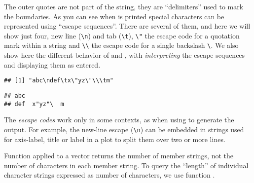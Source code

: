 \documentclass[krantz2]{krantz}\usepackage{knitr}
\begin{document}
The outer quotes are not part of the string, they are ``delimiters'' used to mark the boundaries. As you can see when  is printed special characters can be represented using ``escape sequences''. There are several of them, and here we will show just four, new line (\verb|\n|) and tab (\verb|\t|), \verb|\"| the escape code for a quotation mark within a string and \verb|\\| the escape code for a single backslash \verb|\|. We also show here the different behavior of  and , with  \emph{interpreting} the escape sequences and  displaying them as entered.

\begin{knitrout}\footnotesize
{}\color{fgcolor}\begin{kframe}
\begin{alltt}
 \hlkwb{<-} 
\end{alltt}
\begin{verbatim}
## [1] "abc\ndef\tx\"yz\"\\\tm"
\end{verbatim}
\begin{alltt}
\end{alltt}
\begin{verbatim}
## abc
## def	x"yz"\	m
\end{verbatim}
\end{kframe}
\end{knitrout}

The \textit{escape codes} work only in some contexts, as when using  to generate the output. For example, the new-line escape (\verb|\n|) can be embedded in strings used for axis-label, title or label in a plot to split them over two or more lines.


Function  applied to a  vector returns the number of member strings, not the number of characters in each member string. To query the ``length'' of individual character strings expressed as number of characters, we use function .
\end{document}
